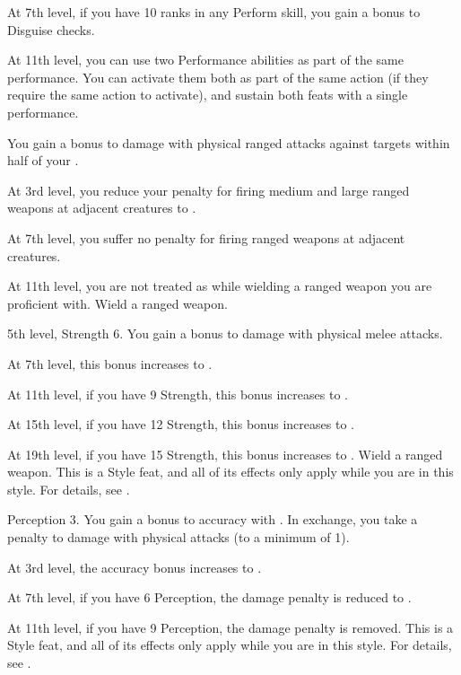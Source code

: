     At 7th level, if you have 10 ranks in any Perform skill, you gain a  bonus to Disguise checks.

    At 11th level, you can use two Performance abilities as part of the same performance.
    You can activate them both as part of the same action (if they require the same action to activate), and sustain both feats with a single performance.

    \featben You gain a  bonus to damage with physical ranged attacks against targets within half of your .

    At 3rd level, you reduce your penalty for firing medium and large ranged weapons at adjacent creatures to .

    At 7th level, you suffer no penalty for firing ranged weapons at adjacent creatures.

    At 11th level, you are not treated as  while wielding a ranged weapon you are proficient with.
    \stylereq Wield a ranged weapon.

    \featpres 5th level, Strength 6.
    \featben You gain a  bonus to damage with physical melee attacks.

    At 7th level, this bonus increases to .

    At 11th level, if you have 9 Strength, this bonus increases to .

    At 15th level, if you have 12 Strength, this bonus increases to .

    At 19th level, if you have 15 Strength, this bonus increases to .
    \stylereq Wield a ranged weapon.
     This is a Style feat, and all of its effects only apply while you are in this style.
    For details, see .

    \featpres Perception 3.
    \featben You gain a  bonus to accuracy with .
    In exchange, you take a  penalty to damage with physical attacks (to a minimum of 1).

    At 3rd level, the accuracy bonus increases to .

    At 7th level, if you have 6 Perception, the damage penalty is reduced to .

    At 11th level, if you have 9 Perception, the damage penalty is removed.
     This is a Style feat, and all of its effects only apply while you are in this style.
    For details, see .

